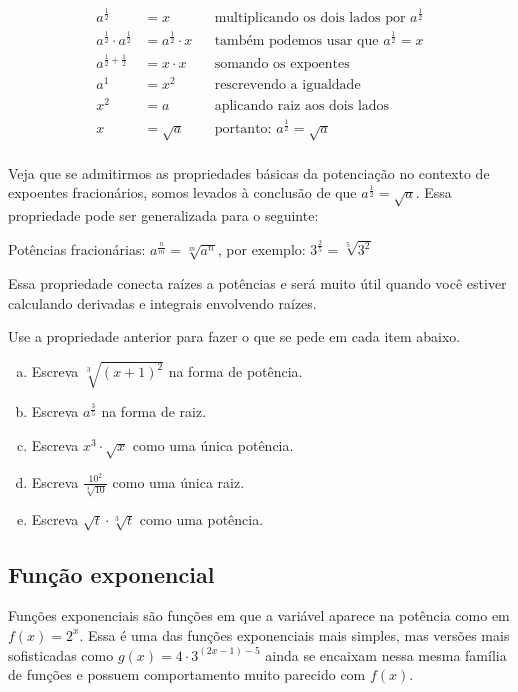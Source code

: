 \documentclass[main_estudante.tex]{subfiles}
\begin{document}
\begin{align*}
a^\frac{1}{2} &= x && \text{multiplicando os dois lados por } a^\frac{1}{2} \\
a^\frac{1}{2} \cdot a^\frac{1}{2} &= a^\frac{1}{2} \cdot x && \text{também podemos usar que } a^\frac{1}{2} = x \\
a^{\frac{1}{2}+\frac{1}{2}} &= x \cdot x && \text{somando os expoentes}\\
a^1 &= x^2 && \text{rescrevendo a igualdade}\\
x^2 &= a && \text{aplicando raiz aos dois lados}\\
x &= \sqrt{a} && \text{portanto: } a^\frac{1}{2} = \sqrt{a} \\
\end{align*}

Veja que se admitirmos as propriedades básicas da potenciação no contexto de expoentes fracionários, somos levados à conclusão de que $a^\frac{1}{2} = \sqrt{a}$. Essa propriedade pode ser generalizada para o seguinte:

\begin{caixaExemplo}
 Potências fracionárias: $a^\frac{n}{m}  = \sqrt[m]{a^n}$, por exemplo: $3^{\frac{2}{5}}=\sqrt[5]{3^2}$
\end{caixaExemplo}

Essa propriedade conecta raízes a potências e será muito útil quando você estiver calculando derivadas e integrais envolvendo raízes.

\begin{questao}
Use a propriedade anterior para fazer o que se pede em cada item abaixo.
\begin{enumerate}[a)]
\item Escreva $\sqrt[3]{(x+1)^2}$ na forma de potência.
\item Escreva  $a^{\frac{3}{5}}$ na forma de raiz.
\item Escreva $x^3 \cdot \sqrt{x}$ como uma única potência.
\item Escreva $\frac{10^2}{\sqrt[3]{10}}$ como uma única raiz.
\item Escreva $\sqrt{t} \cdot \sqrt[3]{t}$ como uma potência.
\end{enumerate}
\end{questao}

\subsection*{Função exponencial}

Funções exponenciais são funções em que a variável aparece na potência como em $f(x)=2^x$. Essa é uma das funções exponenciais mais simples, mas versões mais sofisticadas como $g(x)=4 \cdot 3^{(2x-1)-5}$ ainda se encaixam nessa mesma família de funções e possuem comportamento muito parecido com $f(x)$.
\end{document}
